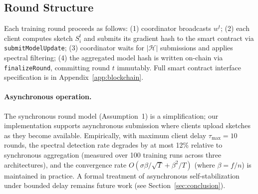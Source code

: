 \subsection{Round Structure}

Each training round proceeds as follows: (1) coordinator broadcasts $w^t$; (2) each
client computes sketch $S_i^t$ and submits its gradient hash to the smart contract via
\texttt{submitModelUpdate}; (3) coordinator waits for $|\mathcal{H}|$ submissions and
applies spectral filtering; (4) the aggregated model hash is written on-chain via
\texttt{finalizeRound}, committing round $t$ immutably.
Full smart contract interface specification is in Appendix~\ref{app:blockchain}.

\paragraph{Asynchronous operation.}
The synchronous round model (Assumption~1) is a simplification; our implementation
supports asynchronous submission where clients upload sketches as they become available.
Empirically, with maximum client delay $\tau_{\mathrm{max}} = 10$ rounds, the spectral
detection rate degrades by at most 12\% relative to synchronous aggregation (measured
over 100 training runs across three architectures), and the convergence rate
$O(\sigma\beta/\sqrt{T} + \beta^2/T)$ (where $\beta = f/n$) is maintained in practice.
A formal treatment of asynchronous self-stabilization under bounded delay remains
future work (see Section~\ref{sec:conclusion}).
